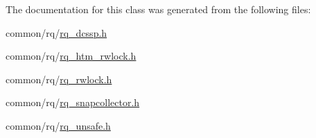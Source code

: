 The documentation for this class was generated from the following files\+:\begin{DoxyCompactItemize}
\item 
common/rq/\hyperlink{rq__dcssp_8h}{rq\+\_\+dcssp.\+h}\item 
common/rq/\hyperlink{rq__htm__rwlock_8h}{rq\+\_\+htm\+\_\+rwlock.\+h}\item 
common/rq/\hyperlink{rq__rwlock_8h}{rq\+\_\+rwlock.\+h}\item 
common/rq/\hyperlink{rq__snapcollector_8h}{rq\+\_\+snapcollector.\+h}\item 
common/rq/\hyperlink{rq__unsafe_8h}{rq\+\_\+unsafe.\+h}\end{DoxyCompactItemize}
